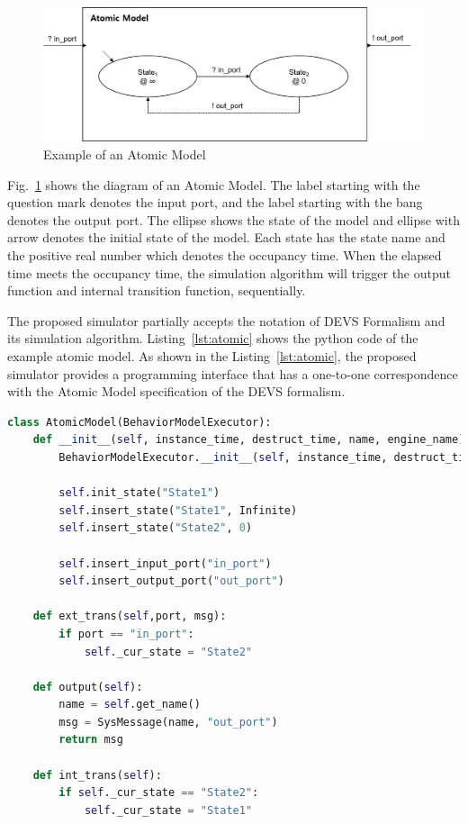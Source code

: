 \documentclass{scsSimAUDPaperFormat}
\begin{document}
\begin{figure}[!h]
    \centering
    \includegraphics[width=1.0\columnwidth]{fig/Atomic_model}
    \caption{Example of an Atomic Model}
    \label{Fig:AtomicModel}
\end{figure}

Fig.~\ref{Fig:AtomicModel} shows the diagram of an Atomic Model. The label starting with the question mark denotes the input port, and the label starting with the bang denotes the output port. The ellipse shows the state of the model and ellipse with arrow denotes the initial state of the model. Each state has the state name and the positive real number which denotes the occupancy time. When the elapsed time meets the occupancy time, the simulation algorithm will trigger the output function and internal transition function, sequentially. 

The proposed simulator partially accepts the notation of DEVS Formalism and its simulation algorithm. Listing~\ref{lst:atomic} shows the python code of the example atomic model. As shown in the Listing~\ref{lst:atomic}, the proposed simulator provides a programming interface that has a one-to-one correspondence with the Atomic Model specification of the DEVS formalism.


\begin{lstlisting}[language=Python, caption=Example Code of Atomic Model, label={lst:atomic}]
class AtomicModel(BehaviorModelExecutor):
    def __init__(self, instance_time, destruct_time, name, engine_name):
        BehaviorModelExecutor.__init__(self, instance_time, destruct_time, name, engine_name)

        self.init_state("State1")
        self.insert_state("State1", Infinite)
        self.insert_state("State2", 0)

        self.insert_input_port("in_port")
        self.insert_output_port("out_port")

    def ext_trans(self,port, msg):
        if port == "in_port":
            self._cur_state = "State2"

    def output(self):
        name = self.get_name()
        msg = SysMessage(name, "out_port")
        return msg
        
    def int_trans(self):
        if self._cur_state == "State2":
            self._cur_state = "State1"
\end{lstlisting}
\end{document}
